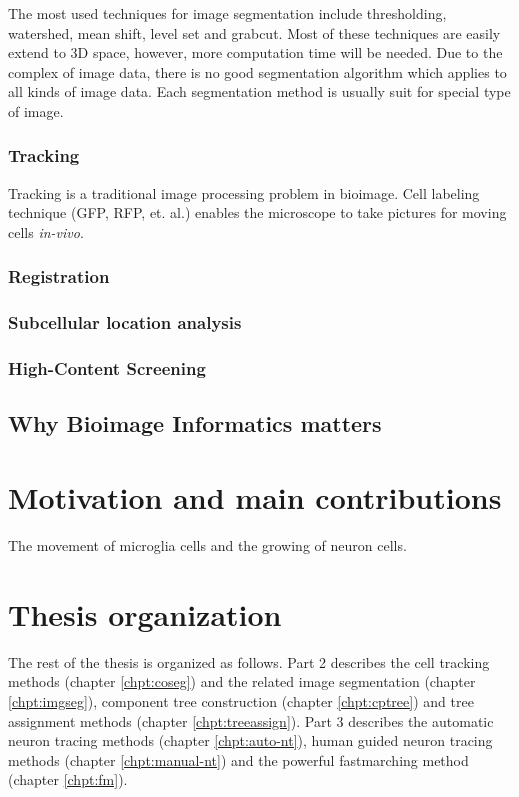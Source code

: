 The most used techniques for image segmentation include thresholding, watershed, mean shift, level set and grabcut. Most of these techniques are easily extend to 3D space, however, more computation time will be needed. Due to the complex of image data, there is no good segmentation algorithm which applies to all kinds of image data. Each segmentation method is usually suit for special type of image.

\subsubsection{Tracking}
Tracking is a traditional image processing problem in bioimage. Cell labeling technique (GFP, RFP, et. al.) enables the microscope to take pictures for moving cells \emph{in-vivo}.
\subsubsection{Registration}
\subsubsection{Subcellular location analysis}
\subsubsection{High-Content Screening}
\subsection{Why Bioimage Informatics matters}


\section{Motivation and main contributions} \label{sec:contrib}
The movement of microglia cells and the growing of neuron cells.
\section{Thesis organization}
The rest of the thesis is organized as follows. Part 2 describes the cell tracking methods (chapter \ref{chpt:coseg}) and the related image segmentation (chapter \ref{chpt:imgseg}), component tree construction (chapter \ref{chpt:cptree}) and tree assignment methods (chapter \ref{chpt:treeassign}). Part 3 describes the automatic neuron tracing methods (chapter \ref{chpt:auto-nt}), human guided neuron tracing methods (chapter \ref{chpt:manual-nt}) and the powerful fastmarching method (chapter \ref{chpt:fm}).

